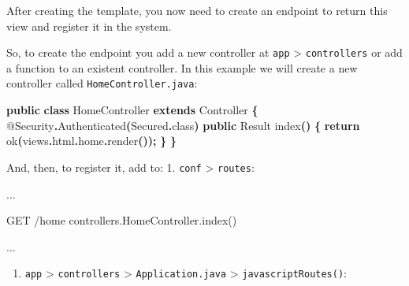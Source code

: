 \documentclass[
  11pt,
]{krantz}
\newenvironment{Shaded}{\begin{snugshade}}{\end{snugshade}}
\newcommand{\AttributeTok}[1]{\textcolor[rgb]{0.61,0.61,0.61}{#1}}
\newcommand{\BuiltInTok}[1]{#1}
\newcommand{\ControlFlowTok}[1]{\textcolor[rgb]{0.27,0.27,0.27}{\textbf{#1}}}
\newcommand{\FunctionTok}[1]{\textcolor[rgb]{0,0,0}{#1}}
\newcommand{\KeywordTok}[1]{\textcolor[rgb]{0.27,0.27,0.27}{\textbf{#1}}}
\newcommand{\NormalTok}[1]{#1}
\newcommand{\OperatorTok}[1]{\textcolor[rgb]{0.43,0.43,0.43}{\textbf{#1}}}
\providecommand{\tightlist}{%
  \setlength{\itemsep}{0pt}\setlength{\parskip}{0pt}}
\begin{document}
After creating the template, you now need to create an endpoint to return this view and register it in the system.

So, to create the endpoint you add a new controller at \texttt{app} \textgreater{} \texttt{controllers} or add a function to an existent controller. In this example we will create a new controller called \texttt{HomeController.java}:

\begin{Shaded}
\begin{Highlighting}[]
\KeywordTok{public} \KeywordTok{class}\NormalTok{ HomeController }\KeywordTok{extends}\NormalTok{ Controller }\OperatorTok{\{}
    \AttributeTok{@Security}\OperatorTok{.}\FunctionTok{Authenticated}\OperatorTok{(}\NormalTok{Secured}\OperatorTok{.}\FunctionTok{class}\OperatorTok{)}
    \KeywordTok{public} \BuiltInTok{Result} \FunctionTok{index}\OperatorTok{()} \OperatorTok{\{}
        \ControlFlowTok{return} \FunctionTok{ok}\OperatorTok{(}\NormalTok{views}\OperatorTok{.}\FunctionTok{html}\OperatorTok{.}\FunctionTok{home}\OperatorTok{.}\FunctionTok{render}\OperatorTok{());}
    \OperatorTok{\}}
\OperatorTok{\}}
\end{Highlighting}
\end{Shaded}

And, then, to register it, add to:
1. \texttt{conf} \textgreater{} \texttt{routes}:

\begin{Shaded}
\begin{Highlighting}[]
\NormalTok{...}

\NormalTok{GET               /home                    controllers.HomeController.index()}

\NormalTok{...}
\end{Highlighting}
\end{Shaded}

\begin{enumerate}
\def\labelenumi{\arabic{enumi}.}
\setcounter{enumi}{1}
\tightlist
\item
  \texttt{app} \textgreater{} \texttt{controllers} \textgreater{} \texttt{Application.java} \textgreater{} \texttt{javascriptRoutes()}:
\end{enumerate}
\end{document}
